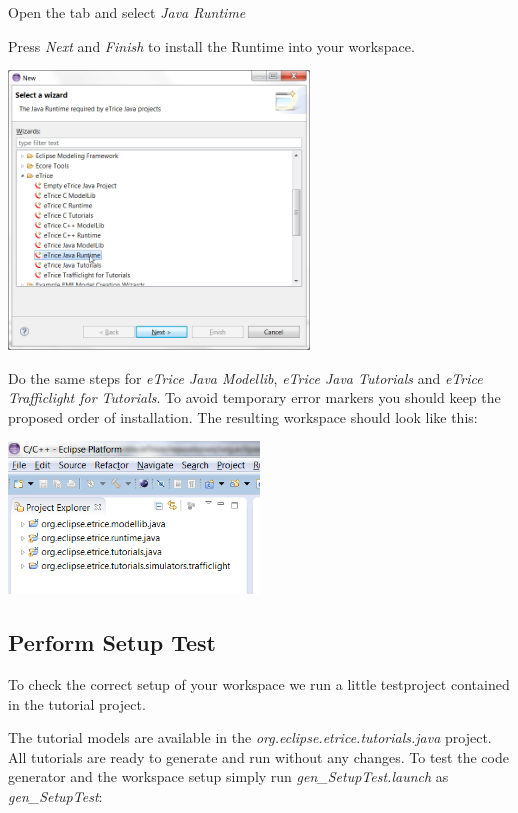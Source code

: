 Open the \eTrice{} tab and select \textit{\eTrice{} Java Runtime}

Press \textit{Next} and \textit{Finish} to install the Runtime into your workspace.

\includegraphics[width=0.6\textwidth]{images/013-SetupWorkspace03.png}

\newpage
Do the same steps for \textit{eTrice Java Modellib}, \textit{eTrice Java Tutorials} and \textit{eTrice Trafficlight for Tutorials}. To avoid temporary 
error markers you should keep the proposed order of installation. The resulting workspace should look like 
this:

\includegraphics[width=0.5\textwidth]{images/013-SetupWorkspace04.png}

\subsection{Perform Setup Test}

To check the correct setup of your workspace we run a little testproject contained in the tutorial project.

The tutorial models are available in the \textit{org.eclipse.etrice.tutorials.java} project. All tutorials are 
ready to generate and run without any changes. To test the code generator and the workspace setup simply run 
\emph{gen\_SetupTest.launch} as \emph{gen\_SetupTest}: 

